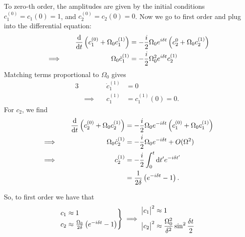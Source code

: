 \documentclass[12pt]{article}
\newcommand{\magsq}[1]{\big|#1\big|^2}
\begin{document}
To zero-th order, the amplitudes are given by the initial conditions $c_1^{(0)} = c_1(0) = 1$, and $c_2^{(0)} = c_2(0) = 0$. Now we go to first order and plug into the differential equation:
\begin{alignat*}{3}
    &\quad & \dv{t}\left(c_1^{(0)} + \Omega_0c_1^{(1)}\right) &= -\frac{i}{2}\Omega_0e^{i\delta t}\left(c_2^{0} + \Omega_0c_2^{(1)}\right) \\
    &\implies\quad & \Omega_0\dot{c}_1^{(1)} &= -\frac{i}{2}\Omega_0^2e^{i\delta t}c_2^{(1)}
\end{alignat*}
Matching terms proportional to $\Omega_0$ gives
\begin{alignat*}{3}
    &\quad & \dot{c}_1^{(1)} &= 0 \\
    &\implies\quad & c_1^{(1)} &= c_1^{(1)}(0) = 0.
\end{alignat*}
For $c_2$, we find
\begin{alignat*}{3}
    &\quad & \dv{t}\left(c_2^{(0)} + \Omega_0c_2^{(1)}\right) &= -\frac{i}{2}\Omega_0e^{-i\delta t}\left(c_1^{(0)} + \Omega_0c_1^{(1)}\right) \\
    &\implies\quad & \Omega_0\dot{c}_2^{(1)} &= -\frac{i}{2}\Omega_0e^{-i\delta t} + O(\Omega^2) \\
    &\implies\quad & c_2^{(1)} &= -\frac{i}{2}\int_0^t\dd t' e^{-i\delta t'} \\
    & & &= \frac{1}{2\delta}\left(e^{-i\delta t} - 1\right).
\end{alignat*}

So, to first order we have that
\begin{equation*}
    \begin{rcases*}
        c_1 \approx 1 \\
        c_2 \approx \frac{\Omega_0}{2\delta}\left(e^{-i\delta t} - 1\right)
    \end{rcases*}
    \implies
    \begin{aligned}
        \magsq{c_1} &\approx 1 \\
        \magsq{c_2} &\approx \frac{\Omega_0^2}{\delta^2}\sin^2\frac{\delta t}{2}
    \end{aligned}
\end{equation*}
\end{document}
